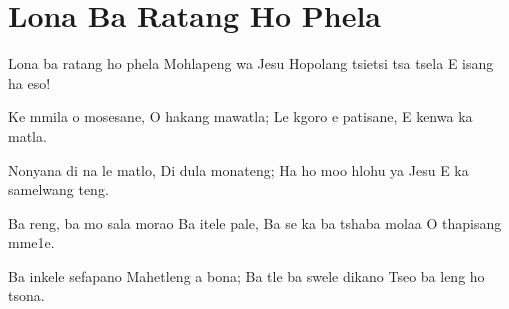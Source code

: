 \starttocol
\chapter{Lona Ba Ratang Ho Phela}
\nexttocol
\hfill{\it }
\stoptocol
\starttocol
\startlines
{\sc Lona} ba ratang ho phela
Mohlapeng wa Jesu 
Hopolang tsietsi tsa tsela
E isang ha eso!

Ke mmila o mosesane,
O hakang mawatla;
Le kgoro e patisane, 
E kenwa ka matla.

Nonyana di na le matlo,
Di dula monateng; 
Ha ho moo hlohu ya Jesu
E ka samelwang teng.

Ba reng, ba mo sala morao
Ba itele pale,
Ba se ka ba tshaba molaa
O thapisang mme1e.

Ba inkele sefapano
Mahetleng a bona;
Ba tle ba swele dikano
Tseo ba leng ho tsona.
\stoplines
\nexttocol

\stoptocol
